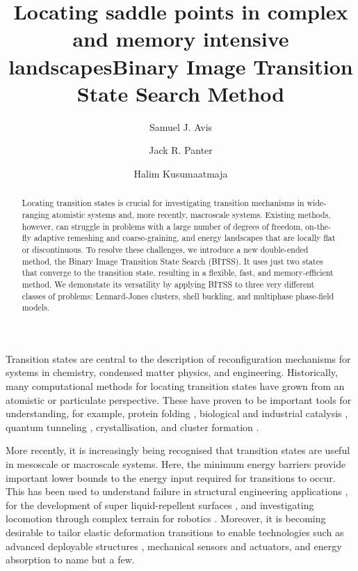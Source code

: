\documentclass[aps,prl,twocolumn,groupedaddress]{revtex4}
\begin{document}
\title{Locating saddle points in complex and memory intensive landscapes}
\title{Binary Image Transition State Search Method}
\author{Samuel J. Avis}
\author{Jack R. Panter}
\author{Halim Kusumaatmaja}

\begin{abstract}
  Locating transition states is crucial for investigating transition mechanisms in wide-ranging atomistic systems and, more recently, macroscale systems.
  Existing methods, however, can struggle in problems with a large number of degrees of freedom, on-the-fly adaptive remeshing and coarse-graining, and energy landscapes that are locally flat or discontinuous.
  To resolve these challenges, we introduce a new double-ended method, the Binary Image Transition State Search (BITSS).
  It uses just two states that converge to the transition state, resulting in a flexible, fast, and memory-efficient method.
  We demonstate its versatility by applying BITSS to three very different classes of problems: Lennard-Jones clusters, shell buckling, and multiphase phase-field models.
\end{abstract}

\maketitle


\topic Transition states are central to the description of reconfiguration mechanisms for systems in chemistry, condensed matter physics, and engineering.
Historically, many computational methods for locating transition states have grown from an atomistic or particulate perspective.
These have proven to be important tools for understanding, for example, protein folding \cite{Bryngelson1995,Onuchic1997}, biological and industrial catalysis \cite{Boehr2006,Kerns2015,Guo2018a}, quantum tunneling \cite{Richardson2016,Vaillant2019}, crystallisation, and cluster formation \cite{Wales1998,Wales2012}.

\topic More recently, it is increasingly being recognised that transition states are useful in mesoscale or macroscale systems.
Here, the minimum energy barriers provide important lower bounds to the energy input required for transitions to occur.
This has been used to understand failure in structural engineering applications \cite{Panter2019,Hutchinson2018}, for the development of super liquid-repellent surfaces \cite{Zhang2014,Panter2019b}, and investigating locomotion through complex terrain for robotics \cite{Othayoth2020}.
Moreover, it is becoming desirable to tailor elastic deformation transitions to enable technologies such as advanced deployable structures \cite{Filipov2015,Zhai2018}, mechanical sensors and actuators, and energy absorption \cite{Shan2015} to name but a few.
\end{document}
